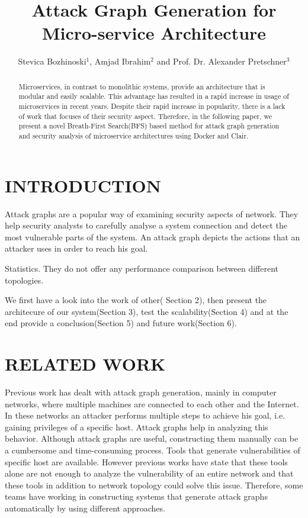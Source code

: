 \documentclass[letterpaper, 10 pt, conference]{ieeeconf}  %
\title{\LARGE \bf
Attack Graph Generation for Micro-service
Architecture
}
\author{Stevica Bozhinoski$^{1}$, Amjad Ibrahim$^{2}$ and Prof. Dr. Alexander Pretschner$^{3}$%
}
\begin{document}
\maketitle
\thispagestyle{empty}
\pagestyle{empty}


\begin{abstract}
Microservices, in contrast to monolithic systems, provide an architecture that is modular and easily scalable. This advantage has resulted in a rapid increase in usage of microservices in recent years. Despite their rapid increase in popularity, there is a lack of work that focuses of their security aspect. Therefore, in the following paper, we present a novel Breath-First Search(BFS) based method for attack graph generation and security analysis of microservice architectures using Docker and Clair. 

\end{abstract}


\section{INTRODUCTION}



Attack graphs are a popular way of examining security aspects of network. They help security analysts to carefully analyse a system connection and detect the most vulnerable parts of the system. An attack graph depicts the actions that an attacker uses in order to reach his goal.  

 Statistics. They do not offer any performance comparison between different topologies. 

We first have a look into the work of other( Section 2), then present the architecure of our system(Section 3), test the scalability(Section 4) and at the end provide a conclusion(Section 5) and future work(Section 6).

\section{RELATED WORK}

Previous work has dealt with attack graph generation, mainly in computer networks, where multiple machines are connected to each other and the Internet. In these networks an attacker performs multiple steps to achieve his goal, i.e. gaining privileges of a specific host. Attack graphs help in analyzing this behavior. Although attack graphs are useful, constructing them manually can be a cumbersome and time-consuming process. Tools that generate vulnerabilities of specific host are available. However previous works have state that these tools alone are not enough to analyze the vulnerability of an entire network and that these tools in addition to network topology could solve this issue. Therefore, some teams have working in constructing systems that generate attack graphs automatically by using different approaches.
\end{document}
